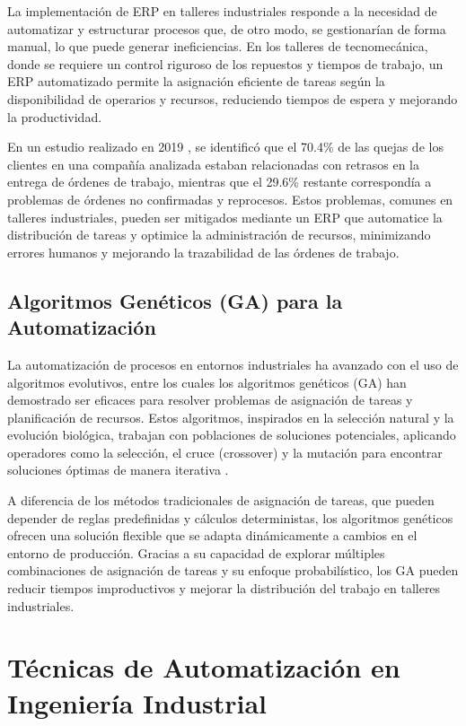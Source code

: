La implementación de ERP en talleres industriales responde a la necesidad de automatizar y estructurar procesos que, de otro modo, se gestionarían de forma manual, lo que puede generar ineficiencias. En los talleres de tecnomecánica, donde se requiere un control riguroso de los repuestos y tiempos de trabajo, un ERP automatizado permite la asignación eficiente de tareas según la disponibilidad de operarios y recursos, reduciendo tiempos de espera y mejorando la productividad. 

En un estudio realizado en 2019 \cite{ref2}, se identificó que el 70.4\% de las quejas de los clientes en una compañía analizada estaban relacionadas con retrasos en la entrega de órdenes de trabajo, mientras que el 29.6\% restante correspondía a problemas de órdenes no confirmadas y reprocesos. Estos problemas, comunes en talleres industriales, pueden ser mitigados mediante un ERP que automatice la distribución de tareas y optimice la administración de recursos, minimizando errores humanos y mejorando la trazabilidad de las órdenes de trabajo.

\subsection{Algoritmos Genéticos (GA) para la Automatización}

La automatización de procesos en entornos industriales ha avanzado con el uso de algoritmos evolutivos, entre los cuales los algoritmos genéticos (GA) han demostrado ser eficaces para resolver problemas de asignación de tareas y planificación de recursos. Estos algoritmos, inspirados en la selección natural y la evolución biológica, trabajan con poblaciones de soluciones potenciales, aplicando operadores como la selección, el cruce (crossover) y la mutación para encontrar soluciones óptimas de manera iterativa \cite{ref3}.

A diferencia de los métodos tradicionales de asignación de tareas, que pueden depender de reglas predefinidas y cálculos deterministas, los algoritmos genéticos ofrecen una solución flexible que se adapta dinámicamente a cambios en el entorno de producción. Gracias a su capacidad de explorar múltiples combinaciones de asignación de tareas y su enfoque probabilístico, los GA pueden reducir tiempos improductivos y mejorar la distribución del trabajo en talleres industriales.

\section{Técnicas de Automatización en Ingeniería Industrial}

